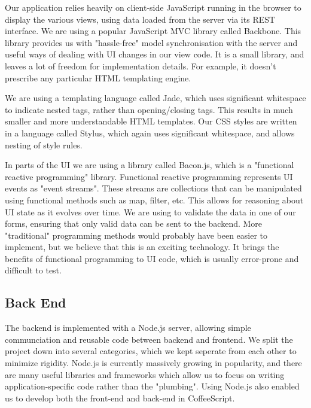 \documentclass[11pt]{article}
\begin{document}
Our application relies heavily on client-side JavaScript running in the browser to display the various views, using data loaded from the server via its REST interface.
We are using a popular JavaScript MVC library called Backbone. This library provides us with "hassle-free" model synchronisation with the server and useful ways of dealing with UI changes in our view code. It is a small library, and leaves a lot of freedom for implementation details. For example, it doesn't prescribe any particular HTML templating engine.

We are using a templating language called Jade, which uses significant whitespace to indicate nested tags, rather than opening/closing tags. This results in much smaller and more understandable HTML templates. Our CSS styles are written in a language called Stylus, which again uses significant whitespace, and allows nesting of style rules.

In parts of the UI we are using a library called Bacon.js, which is a "functional reactive programming" library. Functional reactive programming represents UI events as "event streams". These streams are collections that can be manipulated using functional methods such as map, filter, etc. This allows for reasoning about UI state as it evolves over time. We are using to validate the data in one of our forms, ensuring that only valid data can be sent to the backend. More "traditional" programming methods would probably have been easier to implement, but we believe that this is an exciting technology. It brings the benefits of functional programming to UI code, which is usually error-prone and difficult to test.

\subsection {Back End}

The backend is implemented with a Node.js server, allowing simple communciation and reusable code between backend and frontend. We split the project down into several categories, which we kept seperate from each other to minimize rigidity. Node.js is currently massively growing in popularity, and there are many useful libraries and frameworks which allow us to focus on writing application-specific code rather than the "plumbing". Using Node.js also enabled us to develop both the front-end and back-end in CoffeeScript.
\end{document}
